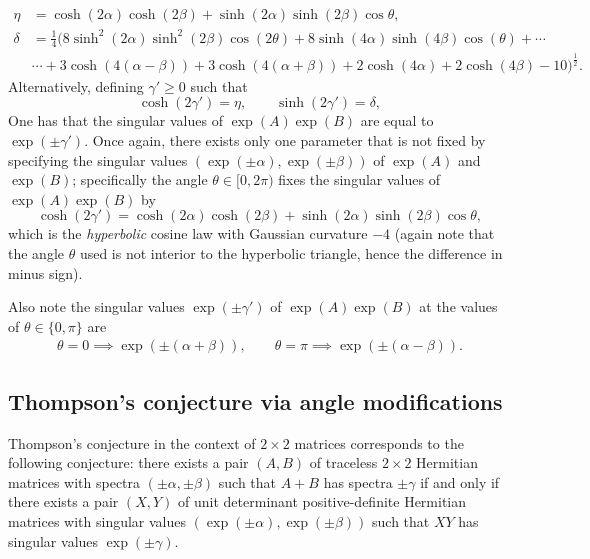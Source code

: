 \documentclass[notitlepage, 10pt]{article}
\begin{document}
\begin{align}
    \eta&=\cosh(2 \alpha) \cosh(2 \beta) + \sinh (2\alpha) \sinh (2\beta)\cos \theta, \\
    \delta&=\frac{1}{4} \bigg(8 \sinh ^2(2 \alpha ) \sinh ^2(2 \beta ) \cos (2 \theta )+8 \sinh (4 \alpha ) \sinh (4 \beta ) \cos (\theta )+\cdots\\&\cdots+3 \cosh (4 (\alpha -\beta ))+3 \cosh (4 (\alpha +\beta ))+2 \cosh (4 \alpha )+2 \cosh (4 \beta )-10\bigg)^{\frac{1}{2}}.
\end{align}
Alternatively, defining $\gamma' \geq 0$ such that
\begin{equation}
    \cosh(2 \gamma') = \eta, \qquad \sinh(2 \gamma') = \delta,
\end{equation}
One has that the singular values of $\exp(A)\exp(B)$ are equal to $\exp(\pm \gamma')$.
Once again, there exists only one parameter that is not fixed by specifying the singular values $(\exp(\pm \alpha), \exp(\pm \beta))$ of $\exp(A)$ and $\exp(B)$; specifically the angle $\theta \in [0,2\pi)$ fixes the singular values of $\exp(A)\exp(B)$ by
\begin{equation}
    \cosh(2 \gamma') = \cosh(2 \alpha) \cosh(2 \beta) + \sinh (2\alpha) \sinh (2\beta)\cos \theta,
\end{equation}
which is the \textit{hyperbolic} cosine law with Gaussian curvature $-4$ (again note that the angle $\theta$ used is not interior to the hyperbolic triangle, hence the difference in minus sign).

Also note the singular values $\exp(\pm \gamma')$ of $\exp(A)\exp(B)$ at the values of $\theta \in \{0, \pi\}$ are
\begin{align}
    \theta = 0 \implies \exp(\pm(\alpha+\beta)), \qquad \theta = \pi \implies \exp(\pm(\alpha-\beta)).
\end{align}

\subsection{Thompson's conjecture via angle modifications}

Thompson's conjecture in the context of $2\times 2$ matrices corresponds to the following conjecture:
there exists a pair $(A,B)$ of traceless $2\times 2$ Hermitian matrices with spectra $(\pm\alpha, \pm\beta)$ such that $A + B$ has spectra $\pm \gamma$ if and only if there exists a pair $(X, Y)$ of unit determinant positive-definite Hermitian matrices with singular values $(\exp(\pm \alpha), \exp(\pm \beta))$ such that $X Y$ has singular values $\exp(\pm \gamma)$. 
\end{document}
